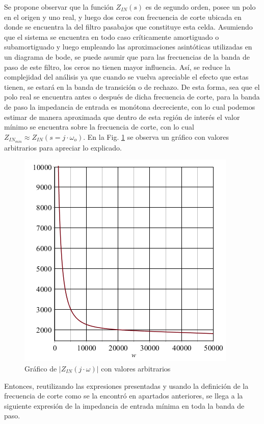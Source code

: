 Se propone observar que la funci\'on $Z_{IN}(s)$ es de segundo orden, posee un polo en el origen y uno real, y luego dos ceros con frecuencia de corte ubicada en donde se encuentra la del filtro pasabajos que constituye esta celda. Asumiendo que el sistema se encuentra en todo caso cr\'iticamente amortiguado o subamortiguado y luego empleando las aproximaciones asint\'oticas
utilizadas en un diagrama de bode, se puede asumir que para las frecuencias de la banda de paso de este filtro, los ceros no tienen mayor influencia. As\'i, se reduce la complejidad del an\'alisis ya que cuando se vuelva apreciable el efecto que estas tienen, se estar\'a en la banda de transici\'on o de rechazo.
De esta forma, sea que el polo real se encuentra antes o despu\'es de dicha frecuencia de corte, para la banda de paso la impedancia de entrada es mon\'otona decreciente, con lo cual podemos estimar de manera aproximada que dentro de esta regi\'on de inter\'es el valor m\'inimo se encuentra sobre la frecuencia de corte,
con lo cual $Z_{IN_{min}} \approx Z_{IN}(s=j \cdot \omega_o)$. En la Fig. \ref{fig:grafico_zin_ideal_arbitraria} se observa un gr\'afico con valores arbitrarios para apreciar lo explicado.

\begin{figure}[H]
    \centering
    \includegraphics[scale=0.6]{../EJ1/Recursos/impedancia_entrada_arbitraria.png}
    \caption{Gr\'afico de $|Z_{IN}(j \cdot \omega)|$ con valores arbitrarios}
    \label{fig:grafico_zin_ideal_arbitraria}
\end{figure}

Entonces, reutilizando las expresiones presentadas y usando la definici\'on de la frecuencia de corte como se la encontr\'o en apartados anteriores, se llega a la siguiente expresi\'on de la impedancia de entrada
m\'inima en toda la banda de paso.

